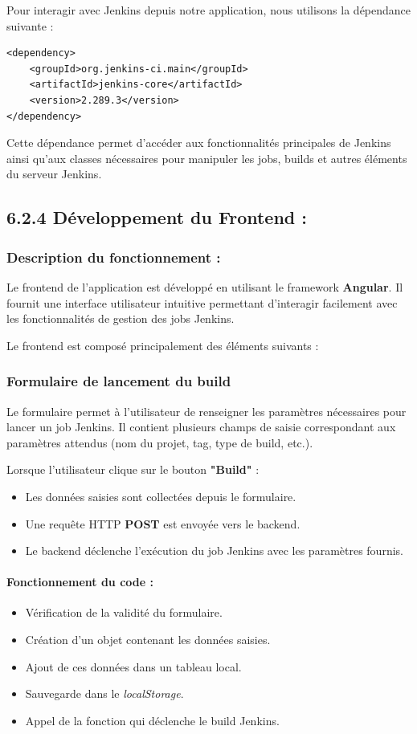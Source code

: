 Pour interagir avec Jenkins depuis notre application, nous utilisons la dépendance suivante :

\begin{verbatim}
<dependency>
    <groupId>org.jenkins-ci.main</groupId>
    <artifactId>jenkins-core</artifactId>
    <version>2.289.3</version>
</dependency>
\end{verbatim}

Cette dépendance permet d’accéder aux fonctionnalités principales de Jenkins ainsi qu’aux classes nécessaires pour manipuler les jobs, builds et autres éléments du serveur Jenkins.
\subsection*{6.2.4 Développement du Frontend :}

\subsubsection*{Description du fonctionnement :}

Le frontend de l’application est développé en utilisant le framework \textbf{Angular}. Il fournit une interface utilisateur intuitive permettant d’interagir facilement avec les fonctionnalités de gestion des jobs Jenkins.

Le frontend est composé principalement des éléments suivants :

\subsubsection*{Formulaire de lancement du build}

Le formulaire permet à l’utilisateur de renseigner les paramètres nécessaires pour lancer un job Jenkins. Il contient plusieurs champs de saisie correspondant aux paramètres attendus (nom du projet, tag, type de build, etc.).

Lorsque l’utilisateur clique sur le bouton \textbf{"Build"} :
\begin{itemize}
    \item Les données saisies sont collectées depuis le formulaire.
    \item Une requête HTTP \textbf{POST} est envoyée vers le backend.
    \item Le backend déclenche l’exécution du job Jenkins avec les paramètres fournis.
\end{itemize}

\paragraph{Fonctionnement du code :}
\begin{itemize}
    \item Vérification de la validité du formulaire.
    \item Création d’un objet contenant les données saisies.
    \item Ajout de ces données dans un tableau local.
    \item Sauvegarde dans le \textit{localStorage}.
    \item Appel de la fonction qui déclenche le build Jenkins.
\end{itemize}

